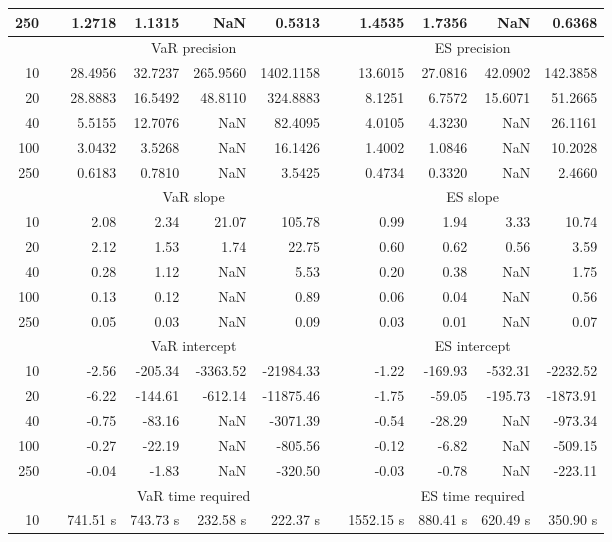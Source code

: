 {\begin{table}[h]
\begin{tabular}{rr rrrr r rrrr}
250 && 1.2718  & 1.1315  &    NaN & 0.5313 && 1.4535  & 1.7356  &    NaN & 0.6368 \\ 
\hline 
 & & \multicolumn{4}{c}{VaR precision} &&  \multicolumn{4}{c}{ES precision} \\ \cline{3-6}  \cline{8-11}
10 && 28.4956  & 32.7237  & 265.9560 & 1402.1158 & & 13.6015  & 27.0816  & 42.0902 & 142.3858 \\ 
20 && 28.8883  & 16.5492  & 48.8110 & 324.8883 & & 8.1251  & 6.7572  & 15.6071 & 51.2665 \\ 
40 && 5.5155  & 12.7076  &    NaN & 82.4095 & & 4.0105  & 4.3230  &    NaN & 26.1161 \\ 
100 && 3.0432  & 3.5268  &    NaN & 16.1426 & & 1.4002  & 1.0846  &    NaN & 10.2028 \\ 
250 && 0.6183  & 0.7810  &    NaN & 3.5425 & & 0.4734  & 0.3320  &    NaN & 2.4660 \\ 
\hline 
 & & \multicolumn{4}{c}{ VaR slope} &&  \multicolumn{4}{c}{ES slope} \\ \cline{3-6}  \cline{8-11}
10 && 2.08  & 2.34  & 21.07 & 105.78 && 0.99  & 1.94  & 3.33 & 10.74 \\ 
20 && 2.12  & 1.53  & 1.74 & 22.75 && 0.60  & 0.62  & 0.56 & 3.59 \\ 
40 && 0.28  & 1.12  &  NaN & 5.53 && 0.20  & 0.38  &  NaN & 1.75 \\ 
100 && 0.13  & 0.12  &  NaN & 0.89 && 0.06  & 0.04  &  NaN & 0.56 \\ 
250 && 0.05  & 0.03  &  NaN & 0.09 && 0.03  & 0.01  &  NaN & 0.07 \\ 
\hline 
 & & \multicolumn{4}{c}{ VaR intercept} &&  \multicolumn{4}{c}{ES intercept} \\ \cline{3-6}  \cline{8-11}
10 && -2.56  & -205.34  & -3363.52 & -21984.33 && -1.22  & -169.93  & -532.31 & -2232.52 \\ 
20 && -6.22  & -144.61  & -612.14 & -11875.46 && -1.75  & -59.05  & -195.73 & -1873.91 \\ 
40 && -0.75  & -83.16  &  NaN & -3071.39 && -0.54  & -28.29  &  NaN & -973.34 \\ 
100 && -0.27  & -22.19  &  NaN & -805.56 && -0.12  & -6.82  &  NaN & -509.15 \\ 
250 && -0.04  & -1.83  &  NaN & -320.50 && -0.03  & -0.78  &  NaN & -223.11 \\ 
\hline 
 & & \multicolumn{4}{c}{VaR time required} && \multicolumn{4}{c}{ES time required} \\ \cline{3-6}  \cline{8-11}
10 & & 741.51 s & 743.73 s & 232.58 s & 222.37 s && 1552.15 s & 880.41 s & 620.49 s & 350.90 s \\ 

\end{tabular}
\end{table}}
